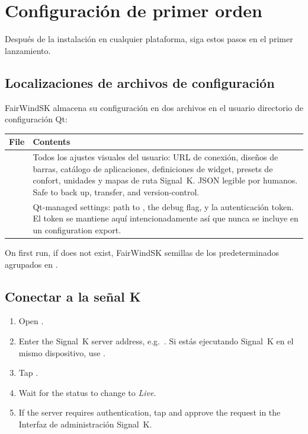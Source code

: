 \section{Configuración de primer orden}
\label{app:firstrun}

Después de la instalación en cualquier plataforma, siga estos pasos en el primer lanzamiento.

\subsection{Localizaciones de archivos de configuración}

FairWindSK almacena su configuración en dos archivos en el usuario
directorio de configuración Qt:

\begin{longtable}{L{3.6cm}L{10.1cm}}
\toprule
{}
\color{white}\sffamily\bfseries File &
\color{white}\sffamily\bfseries Contents \\
\midrule
{}  &
Todos los ajustes visuales del usuario: URL de conexión, diseños de barras, catálogo de aplicaciones,
definiciones de widget, presets de confort, unidades y mapas de ruta Signal~K.
JSON legible por humanos.
  Safe to back up, transfer, and version-control. \\
   &
  Qt-managed settings: path to , the debug flag,
y la autenticación token.
El token se mantiene aquí intencionadamente así que nunca se incluye en un
  configuration export. \\
\bottomrule
\end{longtable}

On first run, if  does not exist, FairWindSK
semillas de los predeterminados agrupados en
.

\subsection{Conectar a la señal K}

\begin{enumerate}
  \item Open .
  \item Enter the Signal~K server address,
        e.g.\ .
Si estás ejecutando Signal~K en el mismo dispositivo,
        use .
  \item Tap .
  \item Wait for the status to change to \textit{Live}.
  \item If the server requires authentication,
        tap  and approve the request in the
Interfaz de administración Signal~K.
\end{enumerate}

